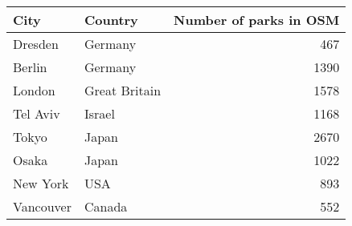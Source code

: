 \begin{tabular}{llr}
\toprule
      City &        Country &  Number of parks in OSM \\
\midrule
   Dresden &        Germany &                     467 \\
    Berlin &        Germany &                    1390 \\
    London &  Great Britain &                    1578 \\
  Tel Aviv &         Israel &                    1168 \\
     Tokyo &          Japan &                    2670 \\
     Osaka &          Japan &                    1022 \\
  New York &            USA &                     893 \\
 Vancouver &         Canada &                     552 \\
\bottomrule
\end{tabular}

